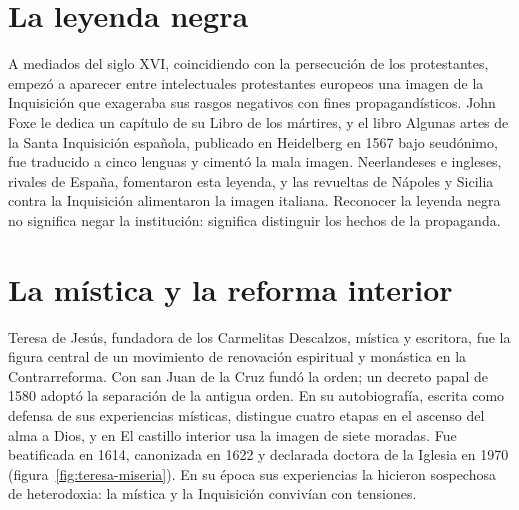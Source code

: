 \documentclass{book}
\begin{document}

\section{La leyenda negra}

A mediados del siglo XVI, coincidiendo con la persecución de los protestantes, empezó a aparecer entre intelectuales protestantes europeos una imagen de la Inquisición que exageraba sus rasgos negativos con fines propagandísticos. John Foxe le dedica un capítulo de su Libro de los mártires, y el libro Algunas artes de la Santa Inquisición española, publicado en Heidelberg en 1567 bajo seudónimo, fue traducido a cinco lenguas y cimentó la mala imagen. Neerlandeses e ingleses, rivales de España, fomentaron esta leyenda, y las revueltas de Nápoles y Sicilia contra la Inquisición alimentaron la imagen italiana. Reconocer la leyenda negra no significa negar la institución: significa distinguir los hechos de la propaganda.


\section{La mística y la reforma interior}

Teresa de Jesús, fundadora de los Carmelitas Descalzos, mística y escritora, fue la figura central de un movimiento de renovación espiritual y monástica en la Contrarreforma. Con san Juan de la Cruz fundó la orden; un decreto papal de 1580 adoptó la separación de la antigua orden. En su autobiografía, escrita como defensa de sus experiencias místicas, distingue cuatro etapas en el ascenso del alma a Dios, y en El castillo interior usa la imagen de siete moradas. Fue beatificada en 1614, canonizada en 1622 y declarada doctora de la Iglesia en 1970 (figura~\ref{fig:teresa-miseria}). En su época sus experiencias la hicieron sospechosa de heterodoxia: la mística y la Inquisición convivían con tensiones.

\end{document}
